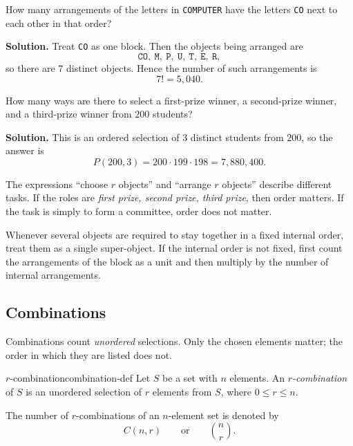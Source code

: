\begin{examplebox}[title={COMPUTER with a block constraint}]
How many arrangements of the letters in \texttt{COMPUTER} have the letters \texttt{CO} next to each other in that order?

\textbf{Solution.}
Treat \texttt{CO} as one block. Then the objects being arranged are
\[
\texttt{CO},\ \texttt{M},\ \texttt{P},\ \texttt{U},\ \texttt{T},\ \texttt{E},\ \texttt{R},
\]
so there are $7$ distinct objects. Hence the number of such arrangements is
\[
7!=5{,}040.
\]
\end{examplebox}

\begin{examplebox}[title={Prize winners}]
How many ways are there to select a first-prize winner, a second-prize winner, and a third-prize winner from $200$ students?

\textbf{Solution.}
This is an ordered selection of $3$ distinct students from $200$, so the answer is
\[
P(200,3)=200\cdot 199\cdot 198=7{,}880{,}400.
\]
\end{examplebox}

\begin{commonmistake}[title={Confusing selection with ordering}]
The expressions ``choose $r$ objects'' and ``arrange $r$ objects'' describe different tasks. If the roles are \emph{first prize, second prize, third prize}, then order matters. If the task is simply to form a committee, order does not matter.
\end{commonmistake}

\begin{extension}[title={Block method as a structural permutation trick}]
Whenever several objects are required to stay together in a fixed internal order, treat them as a single super-object. If the internal order is not fixed, first count the arrangements of the block as a unit and then multiply by the number of internal arrangements.
\end{extension}

\subsection{Combinations}

Combinations count \emph{unordered} selections. Only the chosen elements matter; the order in which they are listed does not.

\begin{definition}{$r$-combination}{combination-def}
Let $S$ be a set with $n$ elements. An \emph{$r$-combination} of $S$ is an unordered selection of $r$ elements from $S$, where $0\le r\le n$.

The number of $r$-combinations of an $n$-element set is denoted by
\[
C(n,r)\qquad\text{or}\qquad \binom{n}{r}.
\]
\end{definition}

